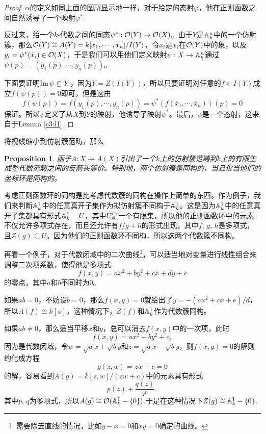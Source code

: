 \documentclass[9pt]{extarticle}
\theoremstyle{plain}%
\newtheorem{pro}[defi]{Proposition}%
\begin{document}
\begin{proof}
	$\alpha$的定义如同上面的图所显示地一样，对于给定的态射$\varphi$，他在正则函数之间自然诱导了一个映射$\varphi^*$.

	反过来，给一个$k$-代数之间的同态$\psi^*:\mathcal{O}(Y)\to \mathcal{O}(X)$。由于$Y$是$\mathbb{A}^n_k$中的一个仿射簇，那么$\mathcal{O}(Y)\cong A(Y)=k[x_1,\cdots,x_n]/I(Y)$，令$\bar{x}_i$是$x_i$在$\mathcal{O}(Y)$中的象，以及$y_i=\psi^*(\bar{x}_i)\in \mathcal{O}(X)$，于是我们可以用他们定义映射$\psi:X\to \mathbb{A}^n_k$通过$\psi(p)=(y_1(p),\cdots,y_n(p))$。

	下面要证明$\operatorname{Im} \psi\subseteq Y$，因为$Y=Z(I(Y))$，所以只要证明对任意的$f\in I(Y)$成立$f(\psi(p))=0$即可，但是这由
	\[
		f(\psi(p))=f(y_1(p),\cdots,y_n(p))=\psi^*(f(\bar{x}_1,\cdots,\bar{x}_n))(p)=0
	\]
	保证。所以$\psi$定义了从$X$到$Y$的映射，他诱导了映射$\psi^*$。最后，$\psi$是一个态射，这来自于Lemma \ref{c3:l1}.
\end{proof}

将视线缩小到仿射簇范畴，那么
\begin{pro}
函子$A:X\to A(X)$引出了一个$k$上的仿射簇范畴到$k$上的有限生成整代数范畴之间的反箭头等价。特别地，两个仿射簇是同构的，当且仅当他们的坐标环是同构的。
\end{pro}

考虑正则函数环的同构是比考虑代数簇的同构在操作上简单的东西。作为例子，我们来判断$\mathbb{A}^1_k$中的任意真开子集作为拟仿射簇不同构于$\mathbb{A}^1_k$。这是因为$\mathbb{A}^1_k$中的任意真开子集都具有形式$\mathbb{A}^1_k-U$，其中$U$是一个有限集，所以他的正则函数环中的元素不仅允许多项式存在，而且还允许有$f/g+h$的形式出现，其中$f$, $g$, $h$是多项式，且$Z(g)\subseteq U$。因为他们的正则函数环不同构，所以这两个代数簇不同构。

再看一个例子，对于代数闭域中的二次曲线\footnote{需要除去直线的情况，比如$y-x=0$和$xy=0$确定的曲线。}，可以适当地对变量进行线性组合来调整二次项系数，使得他是多项式
\[
	f(x,y)=ax^2+by^2+cx+dy+e
\]
的零点，其中$a$和$b$不同时为$0$。

如果$ab=0$，不妨设$b=0$，那么$f(x,y)=0$就给出了$y=-(ax^2+cx+e)/d$，所以$A(f)\cong k[x]$，这种情况下，$Z(f)$和$\mathbb{A}^1_k$作为代数簇同构。

如果$ab\neq 0$，那么适当平移$x$和$y$，总可以消去$f(x,y)$中的一次项，此时
\[
	f(x,y)=ax^2-by^2+c,
\]
因为是代数闭域，令$w=\sqrt{a}x+\sqrt{b}y$和$z=\sqrt{a}x-\sqrt{b}y$，则$f(x,y)=0$的解则约化成方程
\[
	g(z,w)=zw+c=0
\]
的解，容易看到$A(g)=k[z,w]/(zw+c)$中的元素具有形式
\[
	p(z)+\frac{q(z)}{z^n},
\]
其中$p$, $q$为多项式，所以$A(g)\cong \mathcal{O}(\mathbb{A}^1_k-\{0\})$.于是在这种情况下$Z(g)\cong \mathbb{A}^1_k-\{0\}$.
\end{document}

